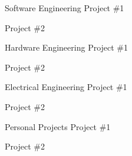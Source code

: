 

\begin{cvskills}

  \cvskill
    {Software Engineering} %
    {Project \#1} %

    
  \cvskill
    {} %
    {Project \#2} %



  \cvskill
    {Hardware Engineering} %
    {Project \#1} %

    
  \cvskill
    {} %
    {Project \#2} %



  \cvskill
    {Electrical Engineering} %
    {Project \#1} %

    
  \cvskill
    {} %
    {Project \#2} %



  \cvskill
    {Personal Projects} %
    {Project \#1} %

    
  \cvskill
    {} %
    {Project \#2} %










\end{cvskills}
